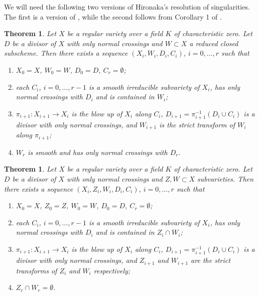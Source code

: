 \documentclass[11pt,a4paper]{amsart}
\numberwithin{equation}{section}
\theoremstyle{plain}
\newtheorem{thm}[prop]{Theorem}
\theoremstyle{definition}
\begin{document}
We will need the following two versions of Hironaka's resolution of
singularities. The first is a version of \cite[Theorem III(N,n)
]{Hironaka:rs}, while the second follows from Corollary 1 of
\cite[Theorem II]{Hironaka:rs}.

\begin{thm}\label{thm:1}
  Let $X$ be a regular variety over a field $K$ of characteristic
  zero. Let $D$ be a divisor of $X$ with only normal crossings and
  $W\subset X$ a reduced closed subscheme. Then there exists a sequence
  $(X_{i},W_{i},D_{i},C_{i})$, $i=0,\dots ,r$ such that
  \begin{enumerate}
  \item $X_{0}=X$, $W_{0}=W$, $D_{0}=D$, $C_{r}=\emptyset$;
  \item each $C_{i}$, $i=0,\dots,r-1$ is a smooth irreducible
    subvariety of $X_{i}$, has only normal
    crossings with $D_{i}$ and is contained in $W_{i}$;
  \item $\pi _{i+1}\colon X_{i+1}\to X_{i}$ is the blow up of $X_{i}$
    along $C_{i}$, $D_{i+1}=\pi _{i+1}^{-1}(D_{i}\cup C_{i})$ is a
    divisor with only normal crossings, and $W_{i+1}$ is the strict
    transform of $W_{i}$ along $\pi _{i+1}$;
  \item  $W_{r}$ is smooth and has only normal crossings with $D_{r}$.
  \end{enumerate}
\end{thm}


\begin{thm}\label{thm:2}
  Let $X$ be a regular variety over a field $K$ of characteristic
  zero. Let $D$ be a divisor of $X$ with only normal crossings and
  $Z, W\subset X$  subvarieties. Then there exists a sequence
  $(X_{i},Z_i,W_{i},D_{i},C_{i})$, $i=0,\dots ,r$ such that
  \begin{enumerate}
  \item $X_{0}=X$, $Z_{0}=Z$, $W_{0}=W$, $D_{0}=D$, $C_{r}=\emptyset$;
  \item each $C_{i}$, $i=0,\dots,r-1$ is a smooth irreducible
    subvariety of $X_{i}$, has only normal
    crossings with $D_{i}$ and is contained in $Z_{i}\cap W_{i}$;
  \item $\pi _{i+1}\colon X_{i+1}\to X_{i}$ is the blow up of $X_{i}$
    along $C_{i}$, $D_{i+1}=\pi _{i+1}^{-1}(D_{i}\cup C_{i})$ is a
    divisor with only normal crossings, and $Z_{i+1}$ and $W_{i+1}$ are the strict
    transforms of $Z_{i}$ and $W_{i}$ respectively;
  \item  $Z_{r}\cap W_{r}=\emptyset$.
  \end{enumerate}
\end{thm}
\end{document}
